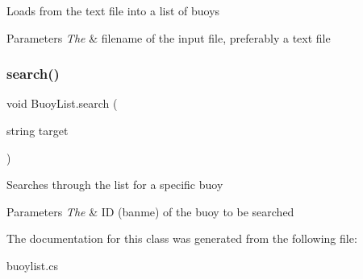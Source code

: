 Loads from the text file into a list of buoys 
\begin{DoxyParams}{Parameters}
{\em The} & filename of the input file, preferably a text file \\
\hline
\end{DoxyParams}
\mbox{\label{class_buoy_list_a8e7b3aae97170c455e436a6924947e9b}} 
\subsubsection{\texorpdfstring{search()}{search()}}
{\footnotesize\ttfamily void Buoy\+List.\+search (\begin{DoxyParamCaption}\item[{string}]{target }\end{DoxyParamCaption})\hspace{0.3cm}{\ttfamily [inline]}}

Searches through the list for a specific buoy 
\begin{DoxyParams}{Parameters}
{\em The} & ID (banme) of the buoy to be searched \\
\hline
\end{DoxyParams}


The documentation for this class was generated from the following file\+:\begin{DoxyCompactItemize}
\item 
buoylist.\+cs\end{DoxyCompactItemize}
